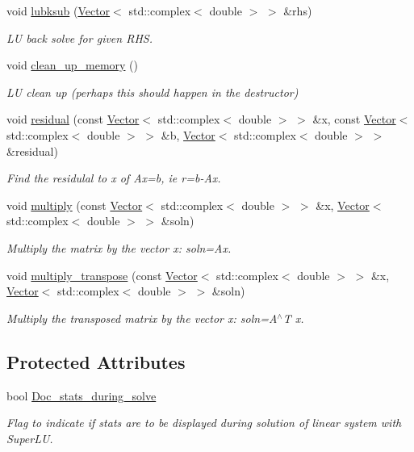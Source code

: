 \begin{DoxyCompactItemize}
void \hyperlink{classoomph_1_1CCComplexMatrix_ade5d51dc8e2a44b6c011184366ce052c}{lubksub} (\hyperlink{classoomph_1_1Vector}{Vector}$<$ std\+::complex$<$ double $>$ $>$ \&rhs)
\begin{DoxyCompactList}\small\item\em LU back solve for given R\+HS. \end{DoxyCompactList}\item 
void \hyperlink{classoomph_1_1CCComplexMatrix_a8697d57e2ed92d56ee6f6e819482fdc3}{clean\+\_\+up\+\_\+memory} ()
\begin{DoxyCompactList}\small\item\em LU clean up (perhaps this should happen in the destructor) \end{DoxyCompactList}\item 
void \hyperlink{classoomph_1_1CCComplexMatrix_ade719948640907a8f338f83ee1587a90}{residual} (const \hyperlink{classoomph_1_1Vector}{Vector}$<$ std\+::complex$<$ double $>$ $>$ \&x, const \hyperlink{classoomph_1_1Vector}{Vector}$<$ std\+::complex$<$ double $>$ $>$ \&b, \hyperlink{classoomph_1_1Vector}{Vector}$<$ std\+::complex$<$ double $>$ $>$ \&residual)
\begin{DoxyCompactList}\small\item\em Find the residulal to x of Ax=b, ie r=b-\/\+Ax. \end{DoxyCompactList}\item 
void \hyperlink{classoomph_1_1CCComplexMatrix_a6c7ba50bf29c2e9f40a68a073534f261}{multiply} (const \hyperlink{classoomph_1_1Vector}{Vector}$<$ std\+::complex$<$ double $>$ $>$ \&x, \hyperlink{classoomph_1_1Vector}{Vector}$<$ std\+::complex$<$ double $>$ $>$ \&soln)
\begin{DoxyCompactList}\small\item\em Multiply the matrix by the vector x\+: soln=Ax. \end{DoxyCompactList}\item 
void \hyperlink{classoomph_1_1CCComplexMatrix_a85c89a6e460b6eb0a1ab704b6272c4d7}{multiply\+\_\+transpose} (const \hyperlink{classoomph_1_1Vector}{Vector}$<$ std\+::complex$<$ double $>$ $>$ \&x, \hyperlink{classoomph_1_1Vector}{Vector}$<$ std\+::complex$<$ double $>$ $>$ \&soln)
\begin{DoxyCompactList}\small\item\em Multiply the transposed matrix by the vector x\+: soln=A$^\wedge$T x. \end{DoxyCompactList}\end{DoxyCompactItemize}
\subsection*{Protected Attributes}
\begin{DoxyCompactItemize}
\item 
bool \hyperlink{classoomph_1_1CCComplexMatrix_a8b3cb444d689a80fc8eab064bde4a7fb}{Doc\+\_\+stats\+\_\+during\+\_\+solve}
\begin{DoxyCompactList}\small\item\em Flag to indicate if stats are to be displayed during solution of linear system with Super\+LU. \end{DoxyCompactList}\end{DoxyCompactItemize}
